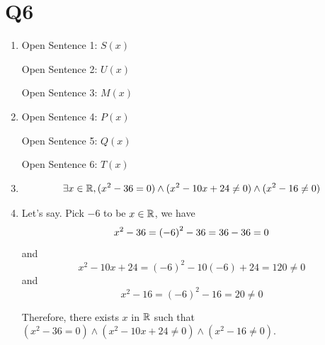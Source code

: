 \section{Q6}
\begin{enumerate}[label = (\alph*)]
    \item Open Sentence 1: $S(x)$
    
    Open Sentence 2: $U(x)$

    Open Sentence 3: $M(x)$

    \newpage
    \item Open Sentence 4: $P(x)$
    
    Open Sentence 5: $Q(x)$

    Open Sentence 6: $T(x)$

    \newpage
    \item 
    \begin{equation*}
        \exists x \in \mathbb{R}, (x^2 - 36 = 0) \wedge (x^2 - 10x + 24 \neq 0) \wedge (x^2 -16 \neq 0)
    \end{equation*}

    \newpage
    \item Let's say. Pick $-6$ to be $x \in \mathbb{R}$, we have 
    \begin{equation*}
        x^2 - 36 = \left(-6\right)^2 - 36 = 36 - 36 = 0 
    \end{equation*}
    and 
    \begin{equation*}
        x^2 - 10x + 24 = (-6)^2 - 10(-6) + 24 = 120  \neq 0
    \end{equation*}
    and 
    \begin{equation*}
        x^2 - 16  = (-6)^2 - 16 = 20 \neq 0
    \end{equation*}

    Therefore, there exists $x$ in $\mathbb{R}$ such that $(x^2 - 36 = 0) \wedge (x^2 - 10x + 24 \neq 0) \wedge (x^2 -16 \neq 0)$. 
\end{enumerate}